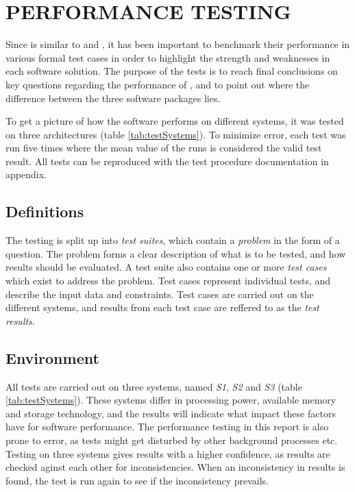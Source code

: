 
\chapter{PERFORMANCE TESTING}

Since \snowman{} is similar to \bhtb{} and \snortmanager{}, it has been important
to benchmark their performance in various formal test cases in order to
highlight the strength and weaknesses in each software solution. The
purpose of the tests is to reach final conclusions on key questions regarding
the performance of \snowman{}, and to point out where the difference between the
three software packages lies.

To get a picture of how the software performs on different systems, it was
tested on three architectures (table \ref{tab:testSystems}). To minimize error, each test
was run five times where the mean value of the runs is considered the valid test
result. All tests can be reproduced with the test procedure documentation in
appendix. %

\section{Definitions}

The testing is split up into \textit{test suites}, which contain a
\textit{problem} in the form of a question. The problem forms a clear
description of what is to be tested, and how results should be evaluated.
A test suite also contains one or more \textit{test cases} which exist to
address the problem. Test cases represent individual tests, and describe the input data
and constraints. Test cases are carried out on the different systems, and
results from each test case are reffered to as the \textit{test results}.

\section{Environment}
All tests are carried out on three systems, named \textit{S1}, \textit{S2} and
\textit{S3} (table \ref{tab:testSystems}). These systems differ in processing
power, available memory and storage technology, and the results will indicate
what impact these factors have for software performance. The performance
testing in this report is also prone to error, as tests might get disturbed by
other background processes etc. Testing on three systems gives results with a
higher confidence, as results are checked aginst each other for 
inconsistencies. When an inconsistency in results is found, the test is run
again to see if the inconsistency prevails.

